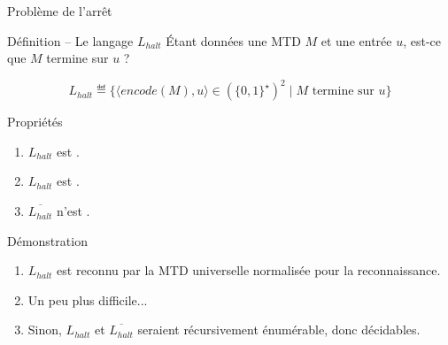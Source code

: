 
\begingroup


\begin{frame}{Problème de l'arrêt}
  \small
 
  \begin{block}{Définition -- Le langage $L_{halt}$}
    Étant données une MTD $M$ et une entrée $u$, est-ce que $M$ termine sur $u$ ? 
 
    $$L_{\mathit{halt}} \eqdef \{ \langle \mathit{encode}(M), u \rangle \in (\{0,1\}^\star)^2  \mid M \text{ termine sur } u \}$$ 
    
  \end{block}
 
  \pause 
  \begin{block}{Propriétés}
    \begin{enumerate}
    \item<2-> $L_{\mathit{halt}}$ est .
    \item<3-> $L_{\mathit{halt}}$ est .
    \item<4-> $\overline{L_{\mathit{halt}}}$ n'est .
    \end{enumerate}
  \end{block}
 
  \begin{block}{Démonstration}
    \begin{enumerate}
    \item<2-> $L_{\mathit{halt}}$ est reconnu par la MTD universelle normalisée pour la reconnaissance.
    \item<3-> Un peu plus difficile...
    \item<4-> Sinon, $L_{\mathit{halt}}$ et $\overline{L_{\mathit{halt}}}$ seraient récursivement énumérable, donc décidables.
    \end{enumerate}
  \end{block}
\end{frame}

\endgroup
\endinput
